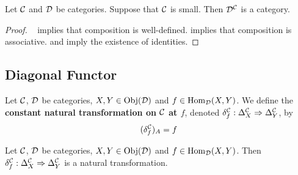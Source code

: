 \documentclass{book}
\begin{document}
	\begin{ex} 
		Let $\mathcal{C}$ and $\mathcal{D}$ be categories. Suppose that $\mathcal{C}$ is small. Then $\mathcal{D}^{\mathcal{C}}$ is a category.
	\end{ex}

	\begin{proof}\
		 implies that composition is well-defined.  implies that composition is associative.  and  imply the existence of identities.  
	\end{proof}


	
	
	
	
	
	
	
	\subsection{Diagonal Functor}

	\begin{defn} 
		Let $\mathcal{C}$, $\mathcal{D}$ be categories, $X, Y \in \operatorname{Obj}(\mathcal{D})$ and $f \in \operatorname{Hom}_{\mathcal{D}}(X, Y)$. We define the \textbf{constant natural transformation on $\mathcal{C}$ at $f$}, denoted $\delta^{\mathcal{C}}_f: \Delta^{\mathcal{C}}_X \Rightarrow \Delta^{\mathcal{C}}_Y$, by
		$$(\delta^{\mathcal{C}}_f)_A = f$$
	\end{defn}
	
	\begin{ex} 
		Let $\mathcal{C}$, $\mathcal{D}$ be categories, $X, Y \in \operatorname{Obj}(\mathcal{D})$ and $f \in \operatorname{Hom}_{\mathcal{D}}(X, Y)$. Then $\delta^{\mathcal{C}}_f: \Delta^{\mathcal{C}}_X \Rightarrow \Delta^{\mathcal{C}}_Y $ is a natural transformation.
	\end{ex}
	
\end{document}
